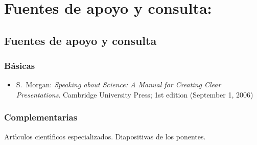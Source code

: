 \section{Fuentes de apoyo y consulta:}

\subsection{Fuentes de apoyo y consulta}

\subsubsection{B\'{a}sicas}

 \begin{itemize}[itemsep=0em]

 \item{S.\ {\sc Morgan}: {\em Speaking about Science: A Manual for
      Creating Clear Presentations}.
    Cambridge University Press; 1st edition (September 1, 2006)}
  
\end{itemize}

\subsubsection{Complementarias}

Art\'{\i}culos cient\'{\i}ficos especializados. Diapositivas de los ponentes.
